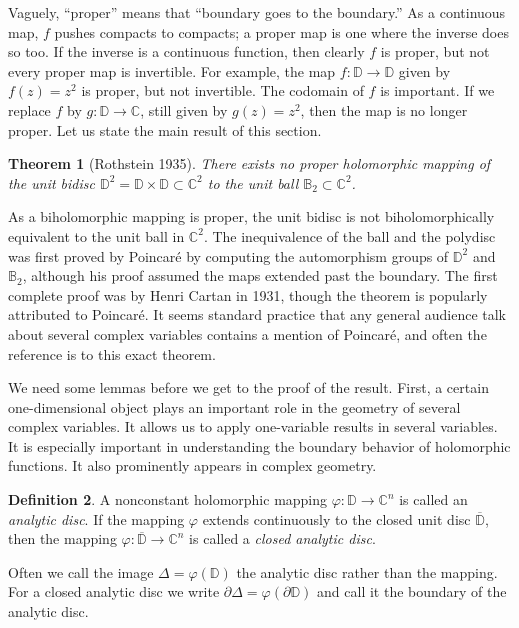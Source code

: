 \documentclass[12pt,openany]{book}
\newcommand{\C}{{\mathbb{C}}}
\newcommand{\D}{{\mathbb{D}}}
\newcommand{\bB}{{\mathbb{B}}}
\newcommand{\myindex}[1]{#1\index{#1}}
\theoremstyle{plain}
\newtheorem{thm}{Theorem}[section]
\theoremstyle{remark}
\theoremstyle{definition}
\newtheorem{defn}[thm]{Definition}
\theoremstyle{exercise}
\theoremstyle{example}
\begin{document}
Vaguely, ``proper'' means that ``boundary goes to the boundary.''
As a continuous map, $f$ pushes compacts to compacts; a proper map is
one where the inverse does so too.  If the inverse is a continuous
function, then clearly $f$ is proper,
but not every proper map is invertible.
For example, the map $f \colon \D \to \D$ given by $f(z) = z^2$ is proper,
but not invertible.  The codomain of $f$ is important.
If we replace $f$ by $g \colon \D \to \C$, still given by $g(z)=z^2$,
then the map is
no longer proper.  Let us state the main result of this section.

\begin{thm}[Rothstein 1935] \label{thm:Rothstein}
There exists no proper holomorphic mapping of the unit bidisc $\D^2 = \D \times \D
\subset \C^2$ to the unit ball $\bB_2 \subset \C^2$.
\end{thm}

As a biholomorphic mapping is proper,
the unit bidisc is not biholomorphically
equivalent to the unit ball in $\C^2$.
The inequivalence of the ball and the polydisc was first proved by
Poincar\'e by computing the automorphism groups of $\D^2$ and $\bB_2$,
although his proof
assumed the maps extended past the boundary.
The first complete proof was by Henri Cartan in 1931, though the theorem is
popularly attributed to Poincar\'e.  It seems standard practice that any general audience talk
about several complex variables contains a mention of Poincar\'e,
and often the reference is to this exact theorem.

We need some lemmas before we get to the proof of the result.  First,
a certain one-dimensional object plays an important role in the geometry
of several complex variables.  It allows us to apply one-variable
results in several variables.  It is especially important in
understanding the boundary behavior of holomorphic functions.  It also
prominently appears in complex geometry.

\begin{defn}
A nonconstant holomorphic mapping
$\varphi \colon \D \to \C^n$ is called an \emph{\myindex{analytic disc}}.
If the mapping $\varphi$ extends continuously to the closed unit disc
$\overline{\D}$, then the mapping
$\varphi \colon \overline{\D} \to \C^n$ is called
a \emph{\myindex{closed analytic disc}}.

Often we call the image $\Delta = \varphi(\D)$ the analytic disc
rather than the mapping.  For a closed analytic disc we write
$\partial \Delta = \varphi( \partial \D)$ and call it the boundary
of the analytic disc.
\end{defn}
\end{document}
